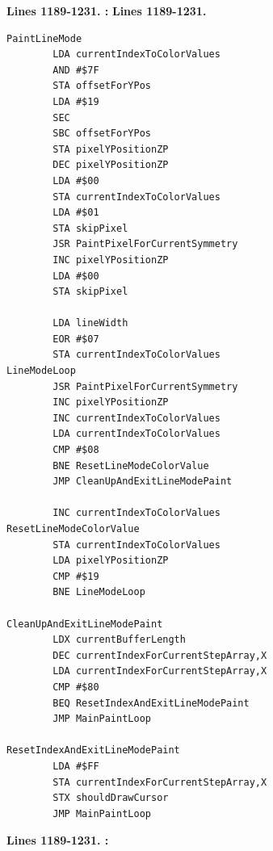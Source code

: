 \textbf{Lines 1189-1231. :} 
\clearpage
\textbf{Lines 1189-1231. } 
\begin{lstlisting}[caption=From \icode{PaintLineMode}.]
PaintLineMode 
        LDA currentIndexToColorValues
        AND #$7F
        STA offsetForYPos
        LDA #$19
        SEC 
        SBC offsetForYPos
        STA pixelYPositionZP
        DEC pixelYPositionZP
        LDA #$00
        STA currentIndexToColorValues
        LDA #$01
        STA skipPixel
        JSR PaintPixelForCurrentSymmetry
        INC pixelYPositionZP
        LDA #$00
        STA skipPixel

        LDA lineWidth
        EOR #$07
        STA currentIndexToColorValues
LineModeLoop   
        JSR PaintPixelForCurrentSymmetry
        INC pixelYPositionZP
        INC currentIndexToColorValues
        LDA currentIndexToColorValues
        CMP #$08
        BNE ResetLineModeColorValue
        JMP CleanUpAndExitLineModePaint

        INC currentIndexToColorValues
ResetLineModeColorValue   
        STA currentIndexToColorValues
        LDA pixelYPositionZP
        CMP #$19
        BNE LineModeLoop

CleanUpAndExitLineModePaint    
        LDX currentBufferLength
        DEC currentIndexForCurrentStepArray,X
        LDA currentIndexForCurrentStepArray,X
        CMP #$80
        BEQ ResetIndexAndExitLineModePaint
        JMP MainPaintLoop

ResetIndexAndExitLineModePaint   
        LDA #$FF
        STA currentIndexForCurrentStepArray,X
        STX shouldDrawCursor
        JMP MainPaintLoop
\end{lstlisting}
\clearpage

\textbf{Lines 1189-1231. :} 
\clearpage
